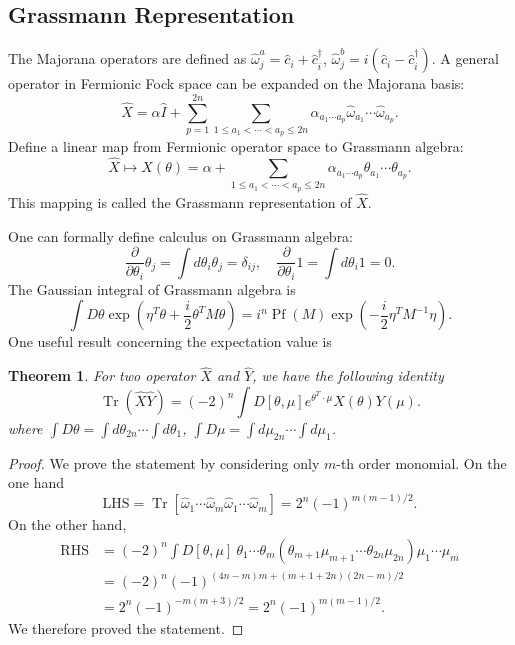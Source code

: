 \documentclass[aps,prx,superscriptaddress,nofootinbib]{revtex4}
\def \Tr{\operatorname{Tr}}
\newtheorem{theorem}{Theorem}
\begin{document}
\subsection{Grassmann Representation}
The Majorana operators are defined as $\hat{\omega}^a_j =\hat{c}_{i}+\hat{c}_{i}^{\dagger}$, $\hat{\omega}^b_j = i(\hat{c}_{i}-\hat{c}_{i}^{\dagger})$. A general operator in Fermionic Fock space can be expanded on the Majorana basis:
\begin{equation}
	\hat{X}=\alpha\hat{I}+\sum_{p=1}^{2n}\sum_{1\le a_{1}<\cdots<a_{p}\le2n}\alpha_{a_{1}\cdots a_{p}}\hat{\omega}_{a_{1}}\cdots\hat{\omega}_{a_{p}}.
\end{equation}
Define a linear map from Fermionic operator space to Grassmann algebra:
\begin{equation}
	\hat X \mapsto X(\theta)=\alpha + \sum_{1\le a_{1}<\cdots<a_{p}\le2n}\alpha_{a_{1}\cdots a_{p}}\theta_{a_{1}}\cdots \theta_{a_{p}}.
\end{equation}
This mapping is called the Grassmann representation of $\hat X$. 

One can formally define calculus on Grassmann algebra:
\begin{equation}
	\frac{\partial}{\partial\theta_{i}}\theta_{j} = \int d\theta_{i}\theta_{j}=\delta_{ij},\quad
	\frac{\partial}{\partial\theta_{i}}1 = \int d\theta_{i}1=0.
\end{equation}
The Gaussian integral of Grassmann algebra is
\begin{equation}
	\int D\theta \exp\left(\eta^T\theta+\frac{i}{2}\theta^T M\theta\right)
	=i^n \operatorname{Pf}(M) \exp\left(-\frac{i}{2}\eta^T M^{-1}\eta\right).
\end{equation}
One useful result concerning the expectation value is
\begin{theorem}
For two operator $\hat X$ and $\hat Y$, we have the following identity 
$$
\Tr\left(\hat{X}\hat{Y}\right)=\left(-2\right)^{n}\int D[\theta,\mu] e^{\theta^{T}\cdot \mu} X(\theta) Y(\mu).
$$
where $\int D\theta=\int d\theta_{2n}\cdots\int d\theta_{1}$, $\int D\mu =\int d\mu_{2n}\cdots\int d\mu_{1}$.
\end{theorem}
\begin{proof}
We prove the statement by considering only $m$-th order monomial. On the one hand 
$$
\text{LHS}=\Tr[\hat\omega_1 \cdots \hat\omega_m \hat\omega_1 \cdots \hat\omega_m] = 2^{n} (-1)^{m(m-1)/2}.
$$
On the other hand,
\begin{equation*}
\begin{aligned}
	\text{RHS} &= \left(-2\right)^{n} \int D[\theta,\mu] \ \theta_1\cdots\theta_m (\theta_{m+1}\mu_{m+1}\cdots \theta_{2n}\mu_{2n})\mu_1 \cdots \mu_m \\
	&= \left(-2\right)^{n} (-1)^{(4n-m)m+(m+1+2n)(2n-m)/2} \\
	&= 2^n(-1)^{-m(m+3)/2} = 2^n(-1)^{m(m-1)/2}.
\end{aligned}
\end{equation*}
We therefore proved the statement.
\end{proof}
\end{document}
